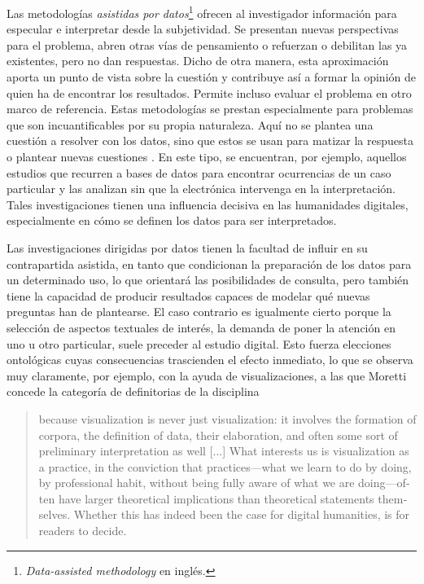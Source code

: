 Las metodologías \textit{asistidas por datos}\footnote{\textit{Data-assisted methodology} en inglés.} ofrecen al investigador información para especular e interpretar desde la subjetividad. Se presentan nuevas perspectivas para el problema, abren otras vías de pensamiento o refuerzan o debilitan las ya existentes, pero no dan respuestas. Dicho de otra manera, esta aproximación aporta un punto de vista sobre la cuestión y contribuye así a formar la opinión de quien ha de encontrar los resultados. Permite incluso evaluar el problema en otro marco de referencia. Estas metodologías se prestan especialmente para problemas que son incuantificables por su propia naturaleza. Aquí no se plantea una cuestión a resolver con los datos, sino que estos se usan para matizar la respuesta o plantear nuevas cuestiones \parencite[7-8]{escobar2021}. En este tipo, se encuentran, por ejemplo, aquellos estudios que recurren a bases de datos para encontrar ocurrencias de un caso particular y las analizan sin que la electrónica intervenga en la interpretación. Tales investigaciones tienen una influencia decisiva en las humanidades digitales, especialmente en cómo se definen los datos para ser interpretados.

Las investigaciones dirigidas por datos tienen la facultad de influir en su contrapartida asistida, en tanto que condicionan la preparación de los datos para un determinado uso, lo que orientará las posibilidades de consulta, pero también tiene la capacidad de producir resultados capaces de modelar qué nuevas preguntas han de plantearse. El caso contrario es igualmente cierto porque la selección de aspectos textuales de interés, la demanda de poner la atención en uno u otro particular, suele preceder al estudio digital. Esto fuerza elecciones ontológicas cuyas consecuencias trascienden el efecto inmediato, lo que se observa muy claramente, por ejemplo, con la ayuda de visualizaciones, a las que Moretti~\parencite*[86]{moretti2019} concede la categoría de definitorias de la disciplina
\blockquote{\begin{english}because visualization is never just
	visualization: it involves the formation of corpora, the definition of data,
their elaboration, and often some sort of preliminary interpretation as
	well [...] What interests us is visualization as a practice, in the conviction that practices—what we learn to do by doing, by professional habit,
	without being fully aware of what we are doing—often have larger theoretical implications than theoretical statements themselves. Whether this has indeed been the case for digital humanities, is for readers to decide.\end{english}}

